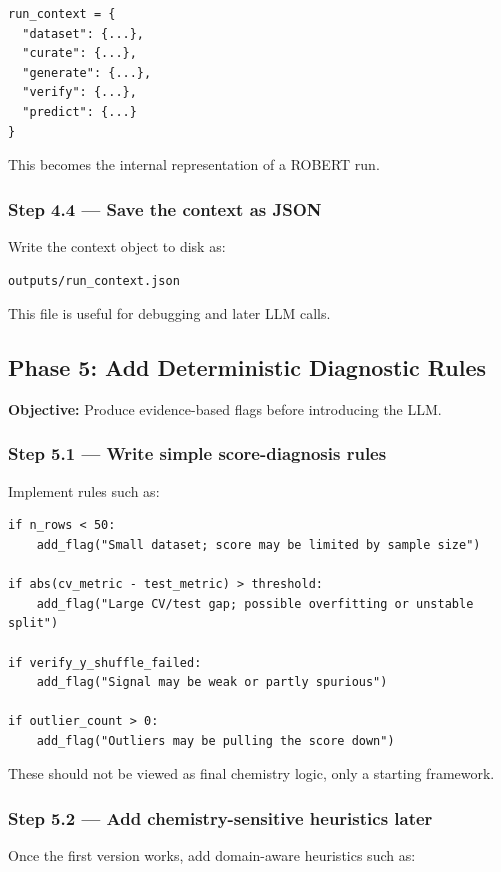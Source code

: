 \documentclass[11pt]{article}
\begin{document}
\begin{verbatim}
run_context = {
  "dataset": {...},
  "curate": {...},
  "generate": {...},
  "verify": {...},
  "predict": {...}
}
\end{verbatim}

This becomes the internal representation of a ROBERT run.

\subsubsection*{Step 4.4 --- Save the context as JSON}
Write the context object to disk as:

\begin{verbatim}
outputs/run_context.json
\end{verbatim}

This file is useful for debugging and later LLM calls.

\subsection{Phase 5: Add Deterministic Diagnostic Rules}
\textbf{Objective:} Produce evidence-based flags before introducing the LLM.

\subsubsection*{Step 5.1 --- Write simple score-diagnosis rules}
Implement rules such as:

\begin{verbatim}
if n_rows < 50:
    add_flag("Small dataset; score may be limited by sample size")

if abs(cv_metric - test_metric) > threshold:
    add_flag("Large CV/test gap; possible overfitting or unstable split")

if verify_y_shuffle_failed:
    add_flag("Signal may be weak or partly spurious")

if outlier_count > 0:
    add_flag("Outliers may be pulling the score down")
\end{verbatim}

These should not be viewed as final chemistry logic, only a starting framework.

\subsubsection*{Step 5.2 --- Add chemistry-sensitive heuristics later}
Once the first version works, add domain-aware heuristics such as:
\end{document}

